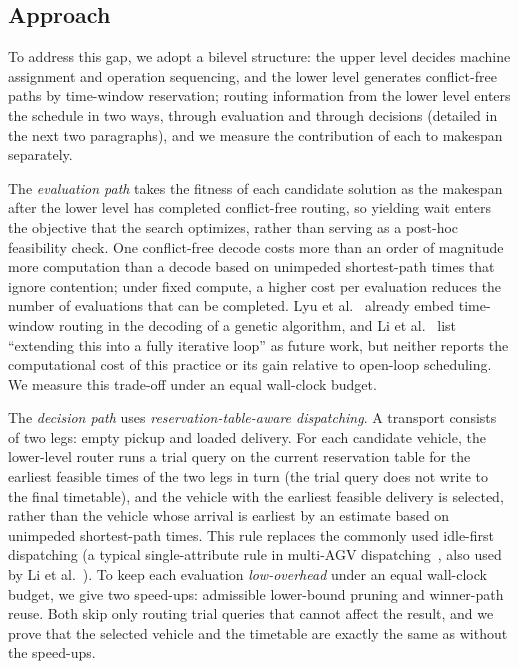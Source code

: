 \subsection{Approach}

To address this gap, we adopt a bilevel structure: the upper level decides machine assignment and operation sequencing, and the lower level generates conflict-free paths by time-window reservation; routing information from the lower level enters the schedule in two ways, through evaluation and through decisions (detailed in the next two paragraphs), and we measure the contribution of each to makespan separately.

The \emph{evaluation path} takes the fitness of each candidate solution as the makespan after the lower level has completed conflict-free routing, so yielding wait enters the objective that the search optimizes, rather than serving as a post-hoc feasibility check.
One conflict-free decode costs more than an order of magnitude more computation than a decode based on unimpeded shortest-path times that ignore contention; under fixed compute, a higher cost per evaluation reduces the number of evaluations that can be completed.
Lyu et al.~\cite{lyu2019approach} already embed time-window routing in the decoding of a genetic algorithm, and Li et al.~\cite{li2026framework} list ``extending this into a fully iterative loop'' as future work, but neither reports the computational cost of this practice or its gain relative to open-loop scheduling. We measure this trade-off under an equal wall-clock budget.

The \emph{decision path} uses \emph{reservation-table-aware dispatching}. A transport consists of two legs: empty pickup and loaded delivery.
For each candidate vehicle, the lower-level router runs a trial query on the current reservation table for the earliest feasible times of the two legs in turn (the trial query does not write to the final timetable),
and the vehicle with the earliest feasible delivery is selected, rather than the vehicle whose arrival is earliest by an estimate based on unimpeded shortest-path times. This rule replaces the commonly used idle-first dispatching (a typical single-attribute rule in multi-AGV dispatching~\cite{lu2022agv}, also used by Li et al.~\cite{li2026framework}). To keep each evaluation \emph{low-overhead} under an equal wall-clock budget, we give two speed-ups:
admissible lower-bound pruning and winner-path reuse. Both skip only routing trial queries that cannot affect the result, and we prove that the selected vehicle and the timetable are exactly the same as without the speed-ups.


